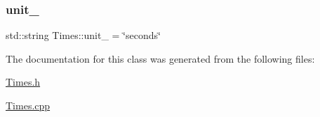 \mbox{\label{class_times_a32130156e076d5511c44fc71ee68a980}} 
\subsubsection{\texorpdfstring{unit\+\_\+}{unit\_}}
{\footnotesize\ttfamily std\+::string Times\+::unit\+\_\+ = \char`\"{}seconds\char`\"{}\hspace{0.3cm}{\ttfamily [protected]}}



The documentation for this class was generated from the following files\+:\begin{DoxyCompactItemize}
\item 
\mbox{\hyperlink{_times_8h}{Times.\+h}}\item 
\mbox{\hyperlink{_times_8cpp}{Times.\+cpp}}\end{DoxyCompactItemize}
